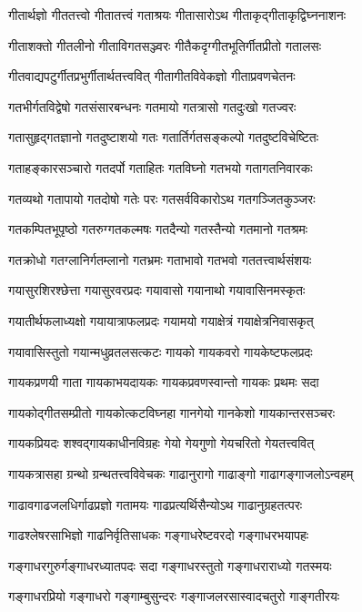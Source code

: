 \twolineshloka
{गीतार्थज्ञो गीततत्त्वो गीतातत्त्वं गताश्रयः}%
{गीतासारोऽथ गीताकृद्गीताकृद्विघ्ननाशनः}%

\twolineshloka
{गीताशक्तो गीतलीनो गीताविगतसञ्ज्वरः}%
{गीतैकदृग्गीतभूतिर्गीतप्रीतो गतालसः}%

\twolineshloka
{गीतवाद्यपटुर्गीतप्रभुर्गीतार्थतत्त्ववित्}%
{गीतागीतविवेकज्ञो गीताप्रवणचेतनः}%

\twolineshloka
{गतभीर्गतविद्वेषो गतसंसारबन्धनः}%
{गतमायो गतत्रासो गतदुःखो गतज्वरः}%

\twolineshloka
{गतासुहृद्गतज्ञानो गतदुष्टाशयो गतः}%
{गतार्तिर्गतसङ्कल्पो गतदुष्टविचेष्टितः}%

\twolineshloka
{गताहङ्कारसञ्चारो गतदर्पो गताहितः}%
{गतविघ्नो गतभयो गतागतनिवारकः}%

\twolineshloka
{गतव्यथो गतापायो गतदोषो गतेः परः}%
{गतसर्वविकारोऽथ गतगञ्जितकुञ्जरः}%

\twolineshloka
{गतकम्पितभूपृष्ठो गतरुग्गतकल्मषः}%
{गतदैन्यो गतस्तैन्यो गतमानो गतश्रमः}%

\twolineshloka
{गतक्रोधो गतग्लानिर्गतम्लानो गतभ्रमः}%
{गताभावो गतभवो गततत्त्वार्थसंशयः}%

\twolineshloka
{गयासुरशिरश्छेत्ता गयासुरवरप्रदः}%
{गयावासो गयानाथो गयावासिनमस्कृतः}%

\twolineshloka
{गयातीर्थफलाध्यक्षो गयायात्राफलप्रदः}%
{गयामयो गयाक्षेत्रं गयाक्षेत्रनिवासकृत्}%

\twolineshloka
{गयावासिस्तुतो गयान्मधुव्रतलसत्कटः}%
{गायको गायकवरो गायकेष्टफलप्रदः}%

\twolineshloka
{गायकप्रणयी गाता गायकाभयदायकः}%
{गायकप्रवणस्वान्तो गायकः प्रथमः सदा}%

\twolineshloka
{गायकोद्गीतसम्प्रीतो गायकोत्कटविघ्नहा}%
{गानगेयो गानकेशो गायकान्तरसञ्चरः}%

\twolineshloka
{गायकप्रियदः शश्वद्गायकाधीनविग्रहः}%
{गेयो गेयगुणो गेयचरितो गेयतत्त्ववित्}%

\twolineshloka
{गायकत्रासहा ग्रन्थो ग्रन्थतत्त्वविवेचकः}%
{गाढानुरागो गाढाङ्गो गाढागङ्गाजलोऽन्वहम्}%

\twolineshloka
{गाढावगाढजलधिर्गाढप्रज्ञो गतामयः}%
{गाढप्रत्यर्थिसैन्योऽथ गाढानुग्रहतत्परः}%

\twolineshloka
{गाढश्लेषरसाभिज्ञो गाढनिर्वृतिसाधकः}%
{गङ्गाधरेष्टवरदो गङ्गाधरभयापहः}%

\twolineshloka
{गङ्गाधरगुरुर्गङ्गाधरध्यातपदः सदा}
{गङ्गाधरस्तुतो गङ्गाधराराध्यो गतस्मयः}%

\twolineshloka
{गङ्गाधरप्रियो गङ्गाधरो गङ्गाम्बुसुन्दरः}%
{गङ्गाजलरसास्वादचतुरो गाङ्गतीरयः}%

